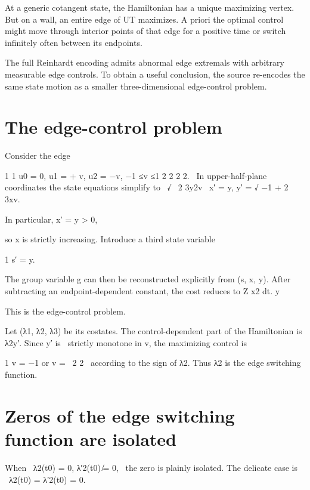 At a generic cotangent state, the Hamiltonian has a unique maximizing vertex. But on a wall, an entire edge of UT maximizes. A priori the optimal control might move through interior points of that edge for a positive time or switch infinitely often between its endpoints.


The full Reinhardt encoding admits abnormal edge extremals with arbitrary measurable edge controls. To obtain a useful conclusion, the source re-encodes the same state motion as a smaller three-dimensional edge-control problem.


\section{The edge-control problem}

Consider the edge


\begin{displaytext}
1 1 u0 = 0, u1 = + v, u2 = −v, −1 ≤v ≤1 2 2 2 2. \
In upper-half-plane coordinates the state equations simplify to \
√ \
2 3y2v \
x′ = y, y′ = √ −1 + 2 3xv.
\end{displaytext}

In particular, x′ = y > 0,


so x is strictly increasing. Introduce a third state variable


1 s′ = y.


The group variable g can then be reconstructed explicitly from (s, x, y). After subtracting an endpoint-dependent constant, the cost reduces to Z x2 dt. y


This is the edge-control problem.


\begin{displaytext}
Let (λ1, λ2, λ3) be its costates. The control-dependent part of the Hamiltonian is λ2y′. Since y′ is \
strictly monotone in v, the maximizing control is
\end{displaytext}

\begin{displaytext}
1 v = −1 or v = \
2 2 \
according to the sign of λ2. Thus λ2 is the edge switching function.
\end{displaytext}

\section{Zeros of the edge switching function are isolated}

\begin{displaytext}
When \
λ2(t0) = 0, λ′2(t0) ̸= 0, \
the zero is plainly isolated. The delicate case is \
λ2(t0) = λ′2(t0) = 0.
\end{displaytext}

